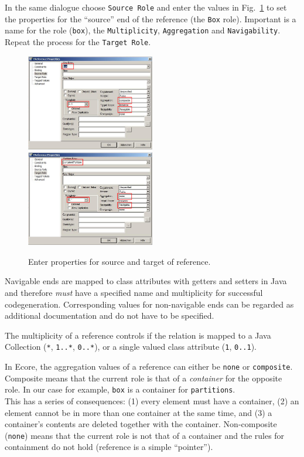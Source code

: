 \clearpage

In the same dialogue choose \texttt{Source Role} and enter the values in
Fig.~\ref{fig:reference_ends} to set the properties for the ``source''
end of the reference (the \texttt{Box} role).  Important is a name for the role
(\texttt{box}), the \texttt{Multiplicity}, \texttt{Aggregation} and
\texttt{Navigability}.  Repeat the process for the \texttt{Target Role}.
  
\begin{figure}[htbp]
	\centering 
  \includegraphics[width=0.5\textwidth]{pics/memBoxBilder/memBox26.png}\\
  \vspace{0.5cm}
  \includegraphics[width=0.5\textwidth]{pics/memBoxBilder/memBox27.png}
	\caption{Enter properties for source and target of reference.}
	\label{fig:reference_ends}
\end{figure}

Navigable ends are mapped to class attributes with getters and setters in Java
and therefore \emph{must} have a specified name and  multiplicity for successful
codegeneration.  
Corresponding values for non-navigable ends can  be regarded as additional
documentation and do not have to be specified.
 
The multiplicity of a reference controls if the relation is mapped to a Java
Collection (\texttt{*},  \texttt{1..*}, \texttt{0..*}), or a single valued class
attribute (\texttt{1}, \texttt{0..1}).

In Ecore, the aggregation values of a reference can either be \texttt{none} or
\texttt{com\-po\-site}.  Composite means that the current role is that of a
\emph{container} for the opposite role.  In our case for example, \texttt{box}
is a container for \texttt{partitions}.\\  This has a series of
consequences: (1) every element must have a container, (2) an element cannot be
in more than one container at the same time, and (3) a container's contents are
deleted together with the container.  Non-composite (\texttt{none}) means that
the current role is not that of a container and the rules for containment do not
hold (reference is a simple ``pointer'').

